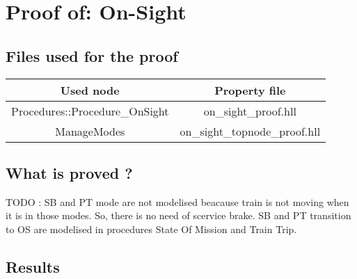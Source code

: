 \section{Proof of: On-Sight}
\subsection{Files used for the proof}
\begin{tabular}{|c|c|}
\hline
Used node & Property file \\ \hline
Procedures::Procedure\_OnSight & on\_sight\_proof.hll \\
\hline
ManageModes & on\_sight\_topnode\_proof.hll \\
\hline
\end{tabular}

\subsection{What is proved ?}

TODO : SB and PT mode are not modelised beacause train is not moving
when it is in those modes. So, there is no need of scervice brake. SB
and PT transition to OS are modelised in procedures State Of Mission
and Train Trip.








\subsection{Results}
